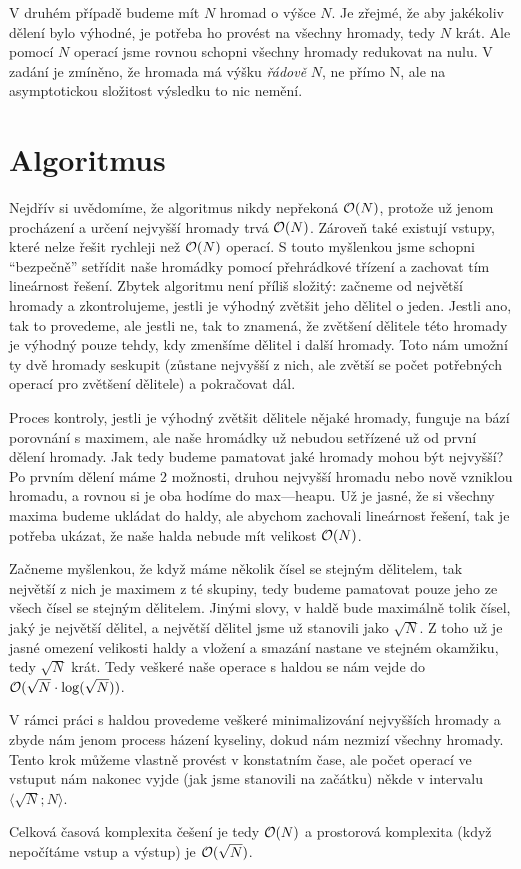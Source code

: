 \documentclass{../../../ksp}
\begin{document}
V druhém případě budeme mít $N$ hromad o výšce $N$.
Je zřejmé, že aby jakékoliv dělení bylo výhodné, je potřeba ho provést na všechny hromady, tedy $N$ krát.
Ale pomocí $N$ operací jsme rovnou schopni všechny hromady redukovat na nulu.
V zadání je zmíněno, že hromada má výšku \emph{řádově} $N$, ne přímo N, ale na asymptotickou složitost výsledku to nic nemění.

\section*{Algoritmus}

Nejdřív si uvědomíme, že algoritmus nikdy nepřekoná $\mathcal{O}(N)$, protože už jenom procházení a určení nejvyšší hromady trvá $\mathcal{O}(N)$.
Zároveň také existují vstupy, které nelze řešit rychleji než $\mathcal{O}(N)$ operací.
S touto myšlenkou jsme schopni ``bezpečně'' setřídit naše hromádky pomocí přehrádkové třízení a zachovat tím lineárnost řešení.
Zbytek algoritmu není příliš složitý: začneme od největší hromady a zkontrolujeme, jestli je výhodný zvětšit jeho dělitel o jeden.
Jestli ano, tak to provedeme, ale jestli ne, tak to znamená, že zvětšení dělitele této hromady je výhodný pouze tehdy, kdy zmenšíme dělitel i další hromady. Toto nám umožní ty dvě hromady seskupit (zůstane nejvyšší z nich, ale zvětší se počet potřebných operací pro zvětšení dělitele) a pokračovat dál.

Proces kontroly, jestli je výhodný zvětšit dělitele nějaké hromady, funguje na bází porovnání s maximem, ale naše hromádky už nebudou setřízené už od první dělení hromady.
Jak tedy budeme pamatovat jaké hromady mohou být nejvyšší?
Po prvním dělení máme 2 možnosti, druhou nejvyšší hromadu nebo nově vzniklou hromadu, a rovnou si je oba hodíme do max---heapu.
Už je jasné, že si všechny maxima budeme ukládat do haldy, ale abychom zachovali lineárnost řešení, tak je potřeba ukázat, že naše halda nebude mít velikost $\mathcal{O}(N)$.

Začneme myšlenkou, že když máme několik čísel se stejným dělitelem, tak největší z nich je maximem z té skupiny, tedy budeme pamatovat pouze jeho ze všech čísel se stejným dělitelem.
Jinými slovy, v haldě bude maximálně tolik čísel, jaký je největší dělitel, a největší dělitel jsme už stanovili jako $\sqrt{N}$.
Z toho už je jasné omezení velikosti haldy a vložení a smazání nastane ve stejném okamžiku, tedy $\sqrt{N}$ krát.
Tedy veškeré naše operace s haldou se nám vejde do $\mathcal{O}(\sqrt{N} \cdot \log(\sqrt{N}))$.

V rámci práci s haldou provedeme veškeré minimalizování nejvyšších hromady a zbyde nám jenom process házení kyseliny, dokud nám nezmizí všechny hromady.
Tento krok můžeme vlastně provést v konstatním čase, ale počet operací ve vstuput nám nakonec vyjde (jak jsme stanovili na začátku) někde v intervalu $\langle \sqrt{N}; N\rangle$.

Celková časová komplexita češení je tedy $\mathcal{O}(N)$ a prostorová komplexita (když nepočítáme vstup a výstup) je $\mathcal{O}(\sqrt{N})$.
\end{document}
